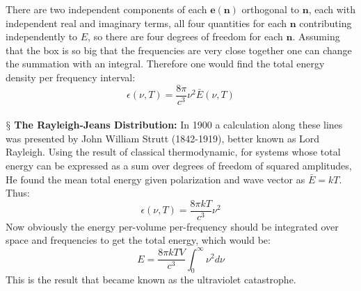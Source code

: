\documentclass[9pt,a4paper, twocolumn]{article}
\newcommand{\newpoint}[1]{\ \\ \indent$\mathsection$ \textbf{#1}}
\newcommand{\vect}[1]{\textbf{#1}}
\begin{document}
            There are two independent components of each $\vect e(\vect n)$ orthogonal to $\vect n$, each with independent real and imaginary terms, all four quantities for each $\vect n$ contributing independently to $E$, so there are four degrees of freedom for each $\vect n$. Assuming that the box is so big that the frequencies are very close together one can change the summation with an integral. Therefore one would find the total energy density per frequency interval:
            \begin{equation}
                \epsilon(\nu, T) = \frac{8\pi}{c^3}\nu^2\bar E(\nu, T)
            \end{equation}
            \newpoint{The Rayleigh-Jeans Distribution:} In 1900 a calculation along these lines was presented by John William Strutt (1842-1919), better known as Lord Rayleigh. Using the result of classical thermodynamic, for systems whose total energy can be expressed as a sum over degrees of freedom of squared amplitudes, He found the mean total energy given polarization and wave vector as $\bar E = kT$. Thus:
            \begin{equation}
                \epsilon(\nu, T) = \frac{8\pi kT}{c^3}\nu^2
            \end{equation}
            Now obviously the energy per-volume per-frequency should be integrated over space and frequencies to get the total energy, which would be:
            \begin{equation}
                E = \frac{8\pi kTV}{c^3}\int_0^\infty \nu^2d\nu
            \end{equation}
            This is the result that became known as the ultraviolet catastrophe.
\end{document}

